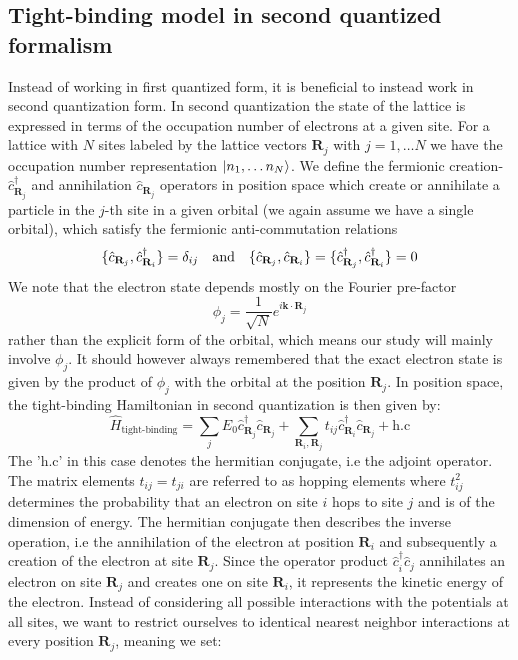 \documentclass[11pt, a4paper, oneside]{book}
\theoremstyle{definition} %
\begin{document}
\subsection{Tight-binding model in second quantized formalism}
Instead of working in first quantized form, it is beneficial to instead work in second quantization form. In second quantization the state of the lattice is expressed in terms of the occupation number of electrons at a given site. For a lattice with $N$ sites labeled by the lattice vectors $\mathbf{R}_j$ with $j = 1, \dots N$ we have the occupation number representation $\ket{n_1, \dots n_N}$. We define  the fermionic creation- $\hat{c}^\dagger_{\mathbf{R}_j}$ and annihilation $\hat{c}_{\mathbf{R}_j}$ operators in position space which create or annihilate a particle in the $j$-th site in a given orbital (we again assume we have a single orbital), which satisfy the fermionic anti-commutation relations
\begin{equation}
	\{\hat{c}_{\mathbf{R}_j}, \hat{c}_{\mathbf{R}_i}^\dagger\} = \delta_{ij} \qq{and} \{\hat{c}_{\mathbf{R}_j}, \hat{c}_{\mathbf{R}_i}\} = \{\hat{c}_{\mathbf{R}_j}^\dagger, \hat{c}_{\mathbf{R}_i}^\dagger\} = 0
	\label{eq:anti_commutation_relations_fermions}
\end{equation}
We note that the electron state depends mostly on the Fourier pre-factor
\begin{equation}
	\phi_j = \frac{1}{\sqrt{N}} e^{i \mathbf{k} \cdot \mathbf{R}_j}
\end{equation}
rather than the explicit form of the orbital, which means our study will mainly involve $\phi_j$. It should however always remembered that the exact electron state is given by the product of $\phi_j$ with the orbital at the position $\mathbf{R}_j$.
In position space, the tight-binding Hamiltonian in second quantization is then given by:
\begin{equation}
	\hat{H}_\text{tight-binding} = \sum_{j} E_0 \hat{c}_{\mathbf{R}_j}^\dagger \hat{c}_{\mathbf{R}_j} + \sum_{\mathbf{R}_i, \mathbf{R}_j} t_{ij} \hat{c}_{\mathbf{R}_i}^\dagger \hat{c}_{\mathbf{R}_j} + \text{h.c}
	\label{eq:tight_binding_Hamiltonian}
\end{equation}
The 'h.c' in this case denotes the hermitian conjugate, i.e the adjoint operator. The matrix elements $t_{ij} = t_{ji}$ are referred to as hopping elements where $t_{ij}^2$ determines the probability that an electron on site $i$ hops to site $j$ and is of the dimension of energy. The hermitian conjugate then describes the inverse operation, i.e the annihilation of the electron at position $\mathbf{R}_i$ and subsequently a creation of the electron at site $\mathbf{R}_j$. Since the operator product $\hat{c}_i^\dagger \hat{c}_j$ annihilates an electron on site $\mathbf{R}_j$ and creates one on site $\mathbf{R}_i$, it represents the kinetic energy of the electron. Instead of considering all possible interactions with the potentials at all sites, we want to restrict ourselves to identical nearest neighbor interactions at every position $\mathbf{R}_j$, meaning we set:
\end{document}
